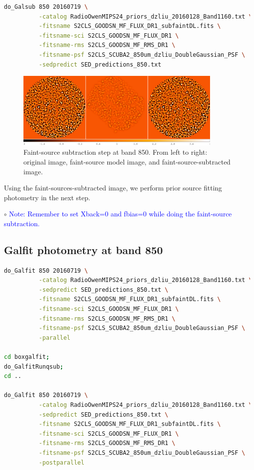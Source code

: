 \documentclass[11pt,a4paper]{article}
\begin{document}
\begin{lstlisting}[language=bash]
do_Galsub 850 20160719 \
          -catalog RadioOwenMIPS24_priors_dzliu_20160128_Band1160.txt \
          -fitsname S2CLS_GOODSN_MF_FLUX_DR1_subfaintDL.fits \
          -fitsname-sci S2CLS_GOODSN_MF_FLUX_DR1 \
          -fitsname-rms S2CLS_GOODSN_MF_RMS_DR1 \
          -fitsname-psf S2CLS_SCUBA2_850um_dzliu_DoubleGaussian_PSF \
          -sedpredict SED_predictions_850.txt
\end{lstlisting}

\begin{figure}[H]
	\caption{Faint-source subtraction step at band 850. From left to right: original image, faint-source model image, and faint-source-subtracted image.}
	\includegraphics[width=0.9\textwidth]{galfit_850_FIT_goodsn_850_Map_20160719_Galsub}
\end{figure}

Using the faint-sources-subtracted image, we perform prior source fitting photometry in the next step. 

\indent\hspace{15pt}$\circ$ 
\textcolor{blue}{Note: Remember to set Xback=0 and fbias=0 while doing the faint-source subtraction.}
\\

\subsection{Galfit photometry at band 850}
\label{Band850_Galfit}

\begin{lstlisting}[language=bash]
do_Galfit 850 20160719 \
          -catalog RadioOwenMIPS24_priors_dzliu_20160128_Band1160.txt \
          -sedpredict SED_predictions_850.txt \
          -fitsname S2CLS_GOODSN_MF_FLUX_DR1_subfaintDL.fits \
          -fitsname-sci S2CLS_GOODSN_MF_FLUX_DR1 \
          -fitsname-rms S2CLS_GOODSN_MF_RMS_DR1 \
          -fitsname-psf S2CLS_SCUBA2_850um_dzliu_DoubleGaussian_PSF \
          -parallel

cd boxgalfit;
do_GalfitRunqsub;
cd ..

do_Galfit 850 20160719 \
          -catalog RadioOwenMIPS24_priors_dzliu_20160128_Band1160.txt \
          -sedpredict SED_predictions_850.txt \
          -fitsname S2CLS_GOODSN_MF_FLUX_DR1_subfaintDL.fits \
          -fitsname-sci S2CLS_GOODSN_MF_FLUX_DR1 \
          -fitsname-rms S2CLS_GOODSN_MF_RMS_DR1 \
          -fitsname-psf S2CLS_SCUBA2_850um_dzliu_DoubleGaussian_PSF \
          -postparallel
\end{lstlisting}
\end{document}
